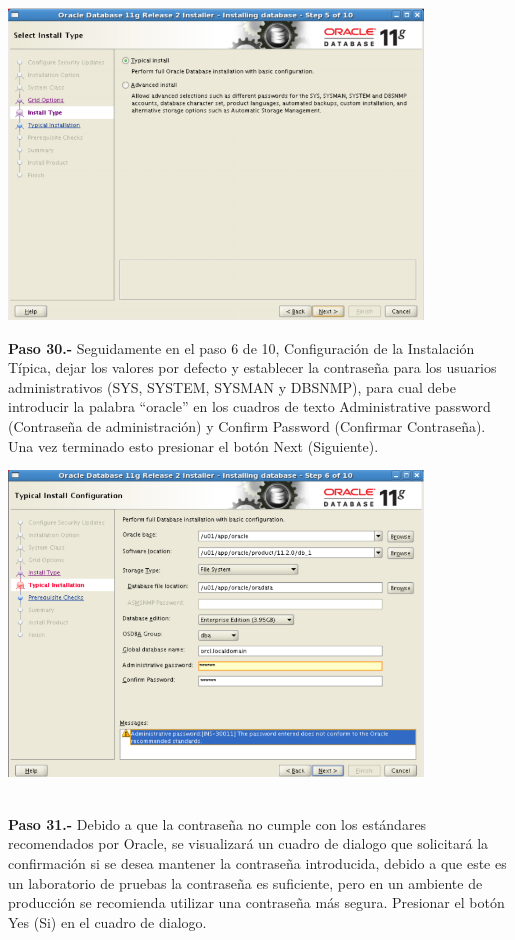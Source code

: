 \begin{enumerate}
\begin{center}
  \includegraphics[width=11cm]{Imagenes/Oracle_Database/Paso_29.png}
\end{center}
\break

\textbf {Paso 30.-} Seguidamente en el paso 6 de 10, Configuración de la Instalación Típica, dejar los valores por defecto y establecer la contraseña para los usuarios administrativos (SYS, SYSTEM, SYSMAN y DBSNMP), para cual
debe introducir la palabra “oracle” en los cuadros de texto Administrative password (Contraseña de administración) y Confirm Password (Confirmar Contraseña). Una vez terminado esto presionar el botón Next (Siguiente).

\begin{center}
  \includegraphics[width=11cm]{Imagenes/Oracle_Database/Paso_30.png}
\end{center}
\vspace{12pt}\\

\textbf {Paso 31.-} Debido a que la contraseña no cumple con los estándares recomendados por Oracle, se visualizará un cuadro de dialogo que solicitará la confirmación si se desea mantener la contraseña introducida, debido a que este es un laboratorio de pruebas la contraseña es suficiente, pero en un ambiente de producción se recomienda utilizar
una contraseña más segura. Presionar el botón Yes (Si) en el cuadro de dialogo.



\end{enumerate}
